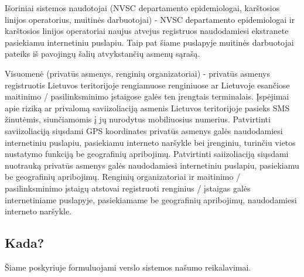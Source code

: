 \documentclass{VUMIFPSkursinis}
\begin{document}
Išoriniai sistemos naudotojai (NVSC departamento epidemiologai, karštosios linijos operatorius, muitinės darbuotojai) - NVSC departamento epidemiologai ir karštosios linijos operatoriai naujus atvejus registruos naudodamiesi
ekstranete pasiekiamu internetiniu puslapiu. Taip pat šiame puslapyje muitinės darbuotojai pateiks iš pavojingų šalių atvykstančių asmenų sąrašą.

Visuomenė (privatūs asmenys, renginių organizatoriai) - privatūs asmenys registruotis Lietuvos teritorijoje rengiamuose renginiuose ar Lietuvoje esančiose maitinimo / pasilinksminimo
įstaigose galės ten įrengtais terminalais. Įspėjimai apie riziką ar privalomą saviizoliaciją asmenis Lietuvos teritorijoje pasieks SMS žinutėmis, siunčiamomis į jų nurodytus
mobiliuosius numerius. Patvirtinti saviizoliaciją siųsdami GPS koordinates privatūs asmenys galės naudodamiesi internetiniu puslapiu, pasiekiamu interneto naršykle bei įrenginiu,
turinčiu vietos nustatymo funkciją be geografinių apribojimų. Patvirtinti saiizoliaciją siųsdami nuotrauką privatūs asmenys galės naudodamiesi internetiniu puslapiu, pasiekiamu
be geografinių apribojimų. Renginių organizatoriai ir maitinimo / pasilinksminimo įstaigų atstovai registruoti renginius / įstaigas galės internetiniame puslapyje, pasiekiamame
be geografinių apribojimų, naudodamiesi interneto naršykle.

\subsection{Kada?}\label{sec:versloReqWhen}
Šiame poskyriuje formuluojami verslo sistemos našumo reikalavimai.
\end{document}
